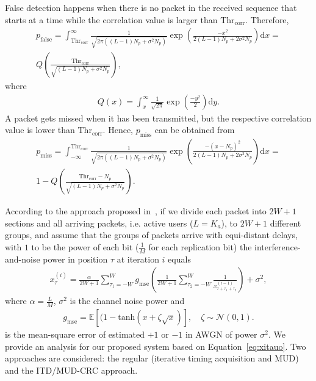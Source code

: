 \documentclass[journal,onecolumn,12pt]{IEEEtran}
\begin{document}
False detection happens when there is no packet in the received sequence that starts at a time while the correlation value is larger than $\text{Thr}_{\text{corr}}$.  Therefore, 
\begin{multline}
p_{\text{false}} = \int_{\text{Thr}_{\text{corr}}}^{\infty}\frac{1}{\sqrt{2\pi ((L-1)N_p+\sigma^2N_p)}}\exp \left(\frac{-x^2}{2(L-1)N_p+2\sigma^2N_p} \right) \text{d}x = \\
Q \left( \frac{\text{Thr}_{\text{corr}}}{\sqrt{ (L-1)N_p+\sigma^2N_p}}\right), \label{eq:pfalse_pre}
\end{multline}
where 
\begin{align}
Q(x) = \int_{x}^{\infty}\frac{1}{\sqrt{2\pi}}\exp \left(\frac{-y^2}{2} \right)\text{d}y.
\end{align}
A packet gets missed when it has been transmitted, but the respective correlation value is lower than $\text{Thr}_{\text{corr}}$. Hence, $p_\text{miss}$ can be obtained from 
\begin{multline}
p_{\text{miss}} = \int_{-\infty}^{\text{Thr}_{\text{corr}}}\frac{1}{\sqrt{2\pi ((L-1)N_p+\sigma^2N_p)}}\exp \left(\frac{-(x-N_p)^2}{2(L-1)N_p+2\sigma^2N_p} \right) \text{d}x =\\
1 - Q \left( \frac{\text{Thr}_{\text{corr}}-N_p}{\sqrt{ (L-1)N_p+\sigma^2N_p}}\right). \label{eq:pmiss_pre}
\end{multline}
	
 According to the approach proposed in~\cite{TS19}, if we divide each packet into $2W+1$ sections and all arriving packets, i.e. active users ($L=K_a$), to $2W+1$ different groups, and assume that the groups of packets arrive with equi-distant delays, with $1$ to be the power of each bit ($\frac{1}{M}$ for each replication bit) the interference-and-noise power in position $\tau$ at iteration $i$ equals 
\begin{align}
x_{\tau}^{(i)} = \frac{\alpha}{2W+1} \sum_{\tau_1=-W}^{W} g_{\text{mse}} \left( \frac{1}{2W+1}\sum_{\tau_2=-W}^{W}\frac{1}{x_{\tau+\tau_1+\tau_2}^{(i-1)}}\right)+\sigma^2, \label{eq:xitauo}
\end{align}
where $\alpha=\frac{L}{M}$, $\sigma^2$ is the channel noise power and
\begin{align}
g_{\text{mse}}= \mathbb{E}\left[(1-\text{tanh}(x+\zeta\sqrt{x})\right], \quad \zeta \sim \mathcal{N}(0,1).
\end{align}
is the mean-square error of estimated $+1$ or $-1$ in AWGN of power $\sigma^2$.
We provide an analysis for our proposed system based on Equation~\ref{eq:xitauo}. Two approaches are considered: the regular (iterative timing acquisition and MUD) and the ITD/MUD-CRC approach.
\end{document}
